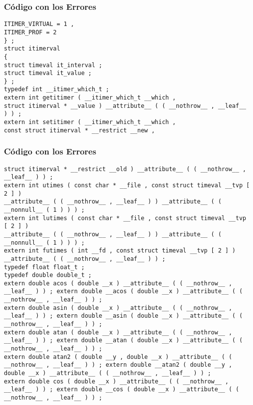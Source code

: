 \documentclass{beamer}
\begin{document}
\begin{frame}[fragile]
\frametitle{C\'odigo con los Errores}
\begin{verbatim}
ITIMER_VIRTUAL = 1 , 
ITIMER_PROF = 2 
} ; 
struct itimerval 
{ 
struct timeval it_interval ; 
struct timeval it_value ; 
} ; 
typedef int __itimer_which_t ; 
extern int getitimer ( __itimer_which_t __which , 
struct itimerval * __value ) __attribute__ ( ( __nothrow__ , __leaf__ ) ) ; 
extern int setitimer ( __itimer_which_t __which , 
const struct itimerval * __restrict __new , 
\end{verbatim}
\end{frame}
\begin{frame}[fragile]
\frametitle{C\'odigo con los Errores}
\begin{verbatim}
struct itimerval * __restrict __old ) __attribute__ ( ( __nothrow__ , __leaf__ ) ) ; 
extern int utimes ( const char * __file , const struct timeval __tvp [ 2 ] ) 
__attribute__ ( ( __nothrow__ , __leaf__ ) ) __attribute__ ( ( __nonnull__ ( 1 ) ) ) ; 
extern int lutimes ( const char * __file , const struct timeval __tvp [ 2 ] ) 
__attribute__ ( ( __nothrow__ , __leaf__ ) ) __attribute__ ( ( __nonnull__ ( 1 ) ) ) ; 
extern int futimes ( int __fd , const struct timeval __tvp [ 2 ] ) __attribute__ ( ( __nothrow__ , __leaf__ ) ) ; 
typedef float float_t ; 
typedef double double_t ; 
extern double acos ( double __x ) __attribute__ ( ( __nothrow__ , __leaf__ ) ) ; extern double __acos ( double __x ) __attribute__ ( ( __nothrow__ , __leaf__ ) ) ; 
extern double asin ( double __x ) __attribute__ ( ( __nothrow__ , __leaf__ ) ) ; extern double __asin ( double __x ) __attribute__ ( ( __nothrow__ , __leaf__ ) ) ; 
extern double atan ( double __x ) __attribute__ ( ( __nothrow__ , __leaf__ ) ) ; extern double __atan ( double __x ) __attribute__ ( ( __nothrow__ , __leaf__ ) ) ; 
extern double atan2 ( double __y , double __x ) __attribute__ ( ( __nothrow__ , __leaf__ ) ) ; extern double __atan2 ( double __y , double __x ) __attribute__ ( ( __nothrow__ , __leaf__ ) ) ; 
extern double cos ( double __x ) __attribute__ ( ( __nothrow__ , __leaf__ ) ) ; extern double __cos ( double __x ) __attribute__ ( ( __nothrow__ , __leaf__ ) ) ; 
\end{verbatim}
\end{frame}
\end{document}
